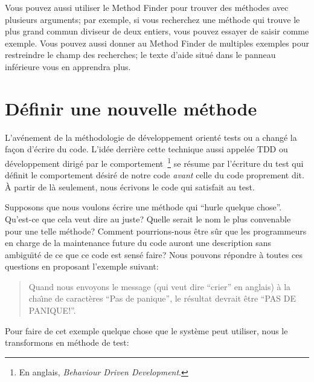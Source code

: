 \documentclass[a4paper,10pt,twoside]{book}
\begin{document}
Vous pouvez aussi utiliser le Method Finder pour trouver des
m\'ethodes avec plusieurs arguments; par exemple, si vous recherchez
une m\'ethode qui trouve le plus grand commun diviseur de deux
entiers, vous pouvez essayer de saisir  comme exemple.
Vous pouvez aussi donner au Method Finder de multiples exemples pour
restreindre le champ des recherches; le texte d'aide situ\'e dans le
panneau inf\'erieure vous en apprendra plus.

\section{D\'efinir une nouvelle m\'ethode}
L'av\'enement de la m\'ethodologie de d\'eveloppement orient\'e tests
ou \cite{Beck03a} a chang\'e la
fa\c{c}on d'\'ecrire du code.
L'id\'ee derri\`ere cette technique aussi appel\'ee TDD ou
développement dirigé par le comportement~\footnote{En anglais,
  \emph{Behaviour Driven Development}.} se r\'esume par l'\'ecriture
du test qui d\'efinit le comportement d\'esir\'e de notre
code \emph{avant} celle du code proprement dit.
\`A partir de l\`a seulement, nous \'ecrivons le code qui satisfait au
test.

Supposons que nous voulons \'ecrire une m\'ethode qui ``hurle quelque
chose''. Qu'est-ce que cela veut dire au juste? Quelle serait le nom
le plus convenable pour une telle m\'ethode? Comment pourrions-nous
\^etre s\^ur que les programmeurs en charge de la maintenance future
du code auront une description sans ambigu\"{\i}t\'e de ce que ce code
est sens\'e faire?
Nous pouvons r\'epondre \`a toutes ces questions en proposant
l'exemple suivant:

\begin{quote}
Quand nous envoyons le message  (qui veut dire ``crier'' en anglais)
\`a la cha\^{\i}ne de caract\`eres ``Pas de panique'', le r\'esultat
devrait \^etre ``PAS DE PANIQUE!''.
\end{quote}

\noindent
Pour faire de cet exemple quelque chose que le syst\`eme peut
utiliser, nous le transformons en m\'ethode de test:
\end{document}
